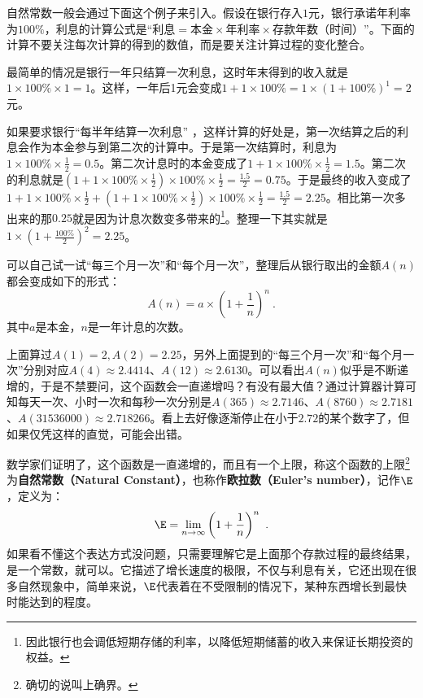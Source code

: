 自然常数一般会通过下面这个例子来引入。假设在银行存入$1$元，银行承诺年利率为$100\%$，利息的计算公式是“$\text{利息}=\text{本金}\times\text{年利率}\times\text{存款年数（时间）}$”。下面的计算不要关注每次计算的得到的数值，而是要关注计算过程的变化整合。

最简单的情况是银行一年只结算一次利息，这时年末得到的收入就是$1\times100\%\times1=1$。这样，一年后1元会变成$1+1\times100\%=1\times(1+100\%)^1=2$元。

如果要求银行“每半年结算一次利息” ，这样计算的好处是，第一次结算之后的利息会作为本金参与到第二次的计算中。于是第一次结算时，利息为$\displaystyle1\times100\%\times\frac{1}{2}=0.5$。第二次计息时的本金变成了$\displaystyle1+1\times100\%\times\frac{1}{2}=1.5$。第二次的利息就是$\displaystyle(1+1\times100\%\times\frac{1}{2})\times100\%\times\frac{1}{2}=\frac{1.5}{2}=0.75$。于是最终的收入变成了$\displaystyle1+1\times100\%\times\frac{1}{2}+(1+1\times100\%\times\frac{1}{2})\times100\%\times\frac{1}{2}=\frac{1.5}{2}=2.25$。相比第一次多出来的那$0.25$就是因为计息次数变多带来的\footnote{因此银行也会调低短期存储的利率，以降低短期储蓄的收入来保证长期投资的权益。}。整理一下其实就是$1\times(1+\frac{100\%}{2})^2=2.25$。

可以自己试一试“每三个月一次”和“每个月一次”，整理后从银行取出的金额$A(n)$都会变成如下的形式：
\begin{equation}
A(n)=a\times\left(1+\frac{1}{n}\right)^n~.
\end{equation}
其中$a$是本金，$n$是一年计息的次数。

上面算过$A(1)=2,A(2)=2.25$，另外上面提到的“每三个月一次”和“每个月一次”分别对应$A(4)\approx 2.4414$、$A(12)\approx 2.6130$。可以看出$A(n)$似乎是不断递增的，于是不禁要问，这个函数会一直递增吗？有没有最大值？通过计算器计算可知每天一次、小时一次和每秒一次分别是$A(365)\approx 2.7146$、$A(8760)\approx2.7181$、$A(31536000)\approx 2.718266$。看上去好像逐渐停止在小于$2.72$的某个数字了，但如果仅凭这样的直觉，可能会出错。

数学家们证明了，这个函数是一直递增的，而且有一个上限，称这个函数的上限\footnote{确切的说叫上确界。}为\textbf{自然常数（Natural Constant）}，也称作\textbf{欧拉数（Euler's number）}，记作$\E$，定义为：
\begin{equation}
\E = \lim_{n \to \infty} \left( 1 + \frac{1}{n} \right)^n~.
\end{equation}
如果看不懂这个表达方式没问题，只需要理解它是上面那个存款过程的最终结果，是一个常数，就可以。它描述了增长速度的极限，不仅与利息有关，它还出现在很多自然现象中，简单来说，$\E$代表着在不受限制的情况下，某种东西增长到最快时能达到的程度。

